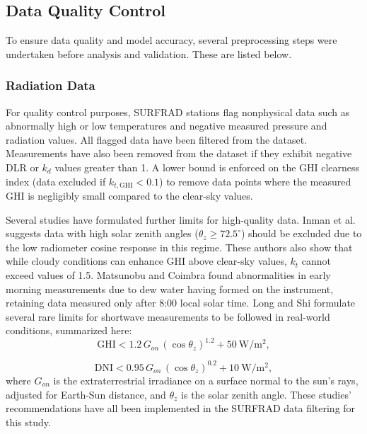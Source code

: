 \documentclass[preprint,12pt]{elsarticle}
\begin{document}
\subsection{Data Quality Control}

To ensure data quality and model accuracy, several preprocessing steps were undertaken before analysis and validation. These are listed below. 

\subsubsection{Radiation Data}

For quality control purposes, SURFRAD stations flag nonphysical data such as abnormally high or low temperatures and negative measured pressure and radiation values. All flagged data have been filtered from the dataset. Measurements have also been removed from the dataset if they exhibit negative DLR or $k_d$ values greater than 1. A lower bound is enforced on the GHI clearness index (data excluded if $k_{t,\mathrm{GHI}}<0.1$) to remove data points where the measured GHI is negligibly small compared to the clear-sky values.  

Several studies have formulated further limits for high-quality data. Inman et al. \cite{inman2016cloud} suggests data with high solar zenith angles ($\theta_z \geq 72.5^\circ$) should be excluded due to the low radiometer cosine response in this regime. These authors also show that while cloudy conditions can enhance GHI above clear-sky values, $k_t$ cannot exceed values of 1.5. Matsunobu and Coimbra \cite{matsunobu2024effective} found abnormalities in early morning measurements due to dew water having formed on the instrument, retaining data measured only after 8:00 local solar time. Long and Shi \cite{long2008automated} formulate several rare limits for shortwave measurements to be followed in real-world conditions, summarized here:  
\begin{equation}
    \mathrm{GHI} < 1.2 \,G_{on} \, (\cos\theta_z)^{1.2} + \SI{50}{\watt \per \meter^2},
\end{equation}

\begin{equation}
     \mathrm{DNI} < 0.95 \, G_{on} \, (\cos\theta_z)^{0.2} + \SI{10}{\watt \per \meter^2} ,
\end{equation}
where $G_{on}$ is the extraterrestrial irradiance on a surface normal to the sun's rays, adjusted for Earth-Sun distance, and $\theta_z$ is the solar zenith angle. These studies' recommendations have all been implemented in the SURFRAD data filtering for this study.
\end{document}
